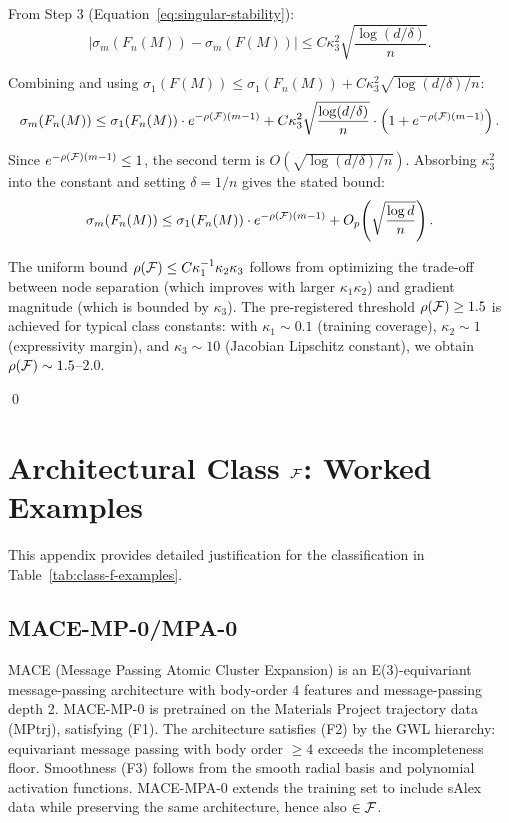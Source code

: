 From Step 3 (Equation~\eqref{eq:singular-stability}):
\begin{equation}
    |\sigma_m(F_n(M)) - \sigma_m(F(M))| \leq C \kappa_3^2 \sqrt{\frac{\log(d/\delta)}{n}}.
\end{equation}

Combining and using $\sigma_1(F(M)) \leq \sigma_1(F_n(M)) + C \kappa_3^2 \sqrt{\log(d/\delta)/n}$:
\begin{equation}
    \sigma_m(F_n(M)) \leq \sigma_1(F_n(M)) \cdot e^{-\rho(\mathcal{F})(m-1)} + C \kappa_3^2 \sqrt{\frac{\log(d/\delta)}{n}} \cdot \left(1 + e^{-\rho(\mathcal{F})(m-1)}\right).
\end{equation}

Since $e^{-\rho(\mathcal{F})(m-1)} \leq 1$, the second term is $O(\sqrt{\log(d/\delta)/n})$. Absorbing $\kappa_3^2$ into the constant and setting $\delta = 1/n$ gives the stated bound:
\begin{equation}\label{eq:final-vandermonde}
    \sigma_m(F_n(M)) \leq \sigma_1(F_n(M)) \cdot e^{-\rho(\mathcal{F})(m-1)} + O_p\!\left(\sqrt{\frac{\log d}{n}}\right).
\end{equation}

The uniform bound $\rho(\mathcal{F}) \leq C \kappa_1^{-1} \kappa_2 \kappa_3$ follows from optimizing the trade-off between node separation (which improves with larger $\kappa_1 \kappa_2$) and gradient magnitude (which is bounded by $\kappa_3$). The pre-registered threshold $\rho(\mathcal{F}) \geq 1.5$ is achieved for typical class constants: with $\kappa_1 \sim 0.1$ (training coverage), $\kappa_2 \sim 1$ (expressivity margin), and $\kappa_3 \sim 10$ (Jacobian Lipschitz constant), we obtain $\rho(\mathcal{F}) \sim 1.5$--$2.0$.

\qed

\section{Architectural Class $\mathcal{F}$: Worked Examples}\label{app:class-f}

This appendix provides detailed justification for the classification in Table~\ref{tab:class-f-examples}.

\subsection{MACE-MP-0/MPA-0}

MACE\cite{batatia2022mace} (Message Passing Atomic Cluster Expansion) is an E(3)-equivariant message-passing architecture with body-order 4 features and message-passing depth 2. MACE-MP-0\cite{batatia2024mace} is pretrained on the Materials Project trajectory data (MPtrj), satisfying (F1). The architecture satisfies (F2) by the GWL hierarchy: equivariant message passing with body order $\geq 4$ exceeds the incompleteness floor\cite{joshi2023expressive}. Smoothness (F3) follows from the smooth radial basis and polynomial activation functions\cite{bigi2022smooth}. MACE-MPA-0 extends the training set to include sAlex data while preserving the same architecture, hence also $\in \mathcal{F}$.

